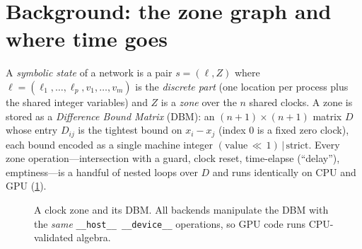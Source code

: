 \documentclass[11pt]{article}
\newcommand{\code}[1]{\texttt{\small #1}}
\begin{document}
\section{Background: the zone graph and where time goes}\label{sec:bg}
A \emph{symbolic state} of a network is a pair $s = (\ell, Z)$ where
$\ell = (\ell_1,\dots,\ell_p, v_1,\dots,v_m)$ is the \emph{discrete part} (one location per process
plus the shared integer variables) and $Z$ is a \emph{zone} over the $n$ shared clocks. A zone is
stored as a \emph{Difference Bound Matrix} (DBM): an $(n{+}1)\times(n{+}1)$ matrix $D$ whose entry
$D_{ij}$ is the tightest bound on $x_i - x_j$ (index $0$ is a fixed zero clock), each bound
encoded as a single machine integer $(\text{value}\,{\ll}\,1)\,|\,\text{strict}$. Every zone
operation---intersection with a guard, clock reset, time-elapse (``delay''), emptiness---is a
handful of nested loops over $D$ and runs identically on CPU and GPU
(\cref{fig:dbm}).

\begin{figure}[t]
\centering
{}
\caption{A clock zone and its DBM. All backends manipulate the DBM with the \emph{same}
\code{\_\_host\_\_ \_\_device\_\_} operations, so GPU code runs CPU-validated algebra.}
\label{fig:dbm}
\end{figure}
\end{document}
